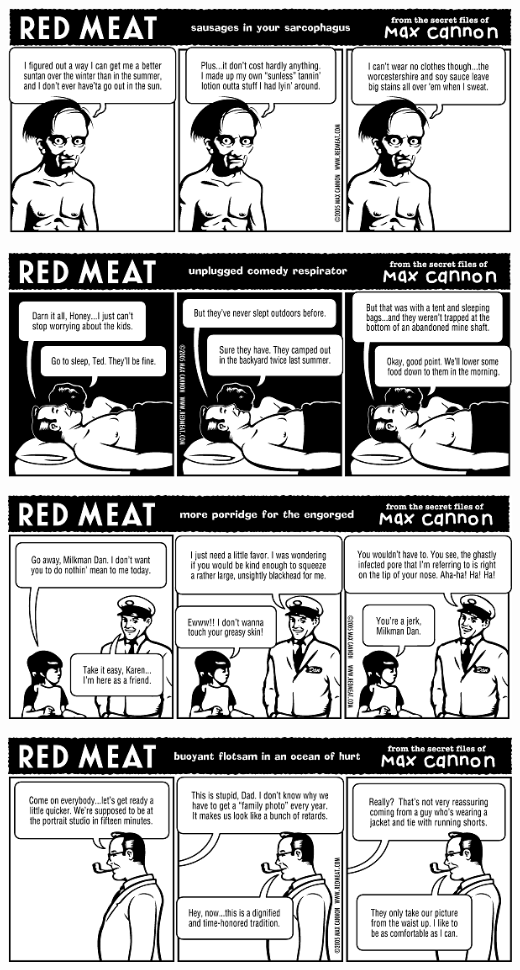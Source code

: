 \documentclass[a4paper,twoside,11pt]{article}
\begin{document}
\includegraphics[width=\textwidth]{redmeat_2005-10-25.png}



\includegraphics[width=\textwidth]{redmeat_2005-11-01.png}



\includegraphics[width=\textwidth]{redmeat_2005-11-08.png}



\includegraphics[width=\textwidth]{redmeat_2005-11-15.png}
\end{document}

